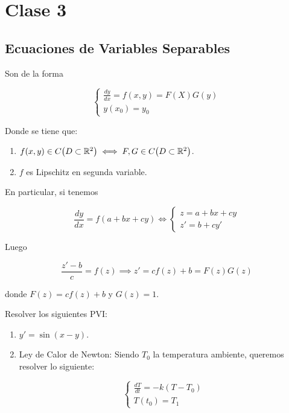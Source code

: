 \section*{Clase 3}
\subsection*{Ecuaciones de Variables Separables}

Son de la forma

\[
    \begin{cases*}
        \frac{dy}{dx} = f(x, y) = F(X)G(y) \\
        y(x_0) = y_0
    \end{cases*}
\]

Donde se tiene que:

\begin{enumerate}
    \item $f(x, y) \in C\big( D \subset \mathbb{R}^2 \big) \iff F, G \in C\big( D \subset \mathbb{R}^2 \big)$.
    \item $f$ es Lipschitz en segunda variable.
\end{enumerate}

En particular, si tenemos

\[
    \frac{dy}{dx} = f(a + bx + cy) \iff \begin{cases*}
                                            z = a + bx + cy \\
                                            z' = b + cy'
                                        \end{cases*}
\]

Luego

\[
    \frac{z' - b}{c} = f(z) \implies z' = cf(z) + b = F(z)G(z)
\]

donde $F(z) = cf(z) + b$ y $G(z) = 1$.


\begin{ejem}
    Resolver los siguientes PVI:

    \begin{enumerate}
        \item $y' = \sin(x-y)$.
        \item Ley de Calor de Newton: Siendo $T_0$ la temperatura ambiente, queremos resolver lo siguiente:
        
        \[
            \begin{cases*}
                \frac{dT}{dt} = -k(T - T_0) \\
                T(t_0) = T_1
            \end{cases*}  
        \]
    \end{enumerate}
\end{ejem}

